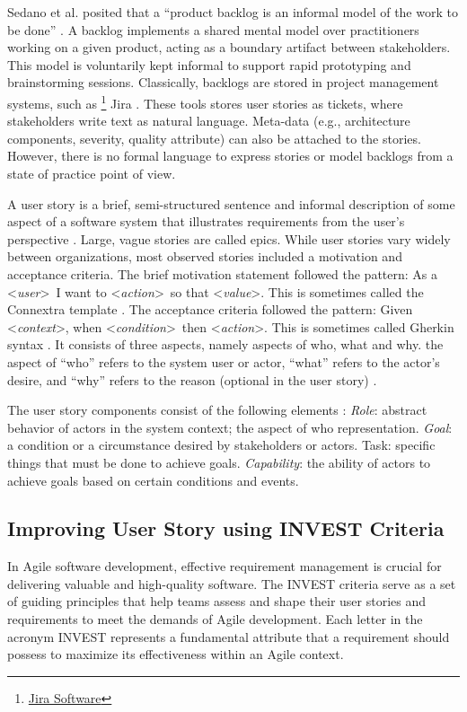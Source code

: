 Sedano et al. posited that a “product backlog is an informal model of the work to be done” \cite{sedano2019product}. A backlog implements a shared mental model over practitioners working on a given product, acting as a boundary artifact between stakeholders. This model is voluntarily kept informal to support rapid prototyping and brainstorming sessions. Classically, backlogs are stored in project management systems, such as \footnote{\href{https://www.atlassian.com/en/software/jira}{Jira Software}} Jira . These tools stores user stories as tickets, where stakeholders write text as natural language. Meta-data (e.g., architecture components, severity, quality attribute) can also be attached to the stories. However, there is no formal language to express stories or model backlogs from a state of practice point of view.

A user story is a brief, semi-structured sentence and informal description of some aspect of a software system that illustrates requirements from the user’s perspective \cite{raharjana2021user}. Large, vague stories are called epics. While user stories vary widely between organizations, most observed stories included a motivation and acceptance criteria. The brief motivation statement followed the pattern:  As a  \textless\emph{user}\textgreater\ I want to \textless\emph{action}\textgreater\ so that \textless\emph{value}\textgreater. This is sometimes called the Connextra template . The acceptance criteria followed the pattern: Given \textless\emph{context}\textgreater, when \textless\emph{condition}\textgreater \  then \textless\emph{action}\textgreater. This is sometimes called Gherkin syntax \cite{wynne2017cucumber}. It consists of three aspects, namely aspects of who, what and why. the aspect of “who” refers to the system user or actor, “what” refers to the actor’s desire, and “why” refers to the reason (optional in the user story) \cite{raharjana2021user}.

The user story components consist of the following elements \cite{wautelet2017user} : \emph{Role}: abstract behavior of actors in the system context; the aspect of who representation. \emph{Goal}: a condition or a circumstance desired by stakeholders or actors. Task: speciﬁc things that must be done to achieve goals. \emph{Capability}: the ability of actors to achieve goals based on certain conditions and events.
\subsection{Improving User Story using INVEST Criteria} \label{invest}
In Agile software development, effective requirement management is crucial for delivering valuable and high-quality software. The INVEST criteria serve as a set of guiding principles that help teams assess and shape their user stories and requirements to meet the demands of Agile development. Each letter in the acronym INVEST represents a fundamental attribute that a requirement should possess to maximize its effectiveness within an Agile context.

